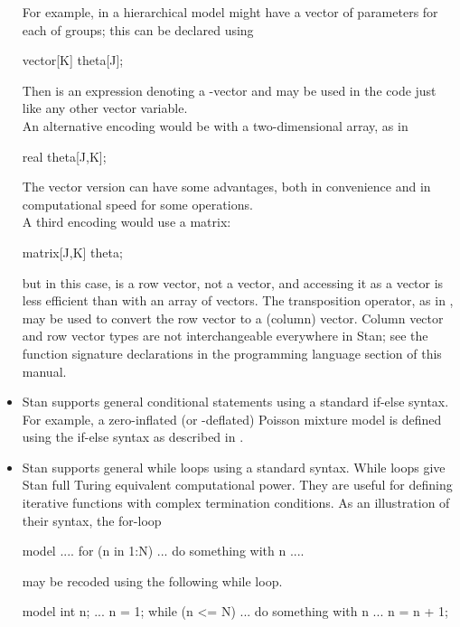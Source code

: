 \begin{itemize}
  For example, in a hierarchical model might have a vector of 
  parameters for each of  groups; this can be declared using
\begin{stancode}
vector[K] theta[J];
\end{stancode}
%
Then  is an expression denoting a -vector and
may be used in the code just like any other vector variable.
\\[6pt]
An alternative encoding would be with a two-dimensional array, as in
\begin{stancode}
real theta[J,K];
\end{stancode}
%
The vector version can have some advantages, both in convenience and
in computational speed for some operations.
\\[6pt]
A third encoding would use a matrix:
%
\begin{stancode}
matrix[J,K] theta;
\end{stancode}
%
but in this case,  is a row vector, not a vector, and
accessing it as a vector is less efficient than with an array of
vectors.  The transposition operator, as in , may be
used to convert the row vector  to a (column) vector.
Column vector and row vector types are not interchangeable everywhere
in Stan; see the function signature declarations in the programming
language section of this manual.
%
\item Stan supports general conditional statements using a standard
  if-else syntax.  For example, a zero-inflated (or -deflated) Poisson
  mixture model is defined using the if-else syntax as described in
  . 
%
\item Stan supports general while loops using a standard syntax.  
While loops give Stan full Turing equivalent computational power.
They are useful for defining iterative functions with complex
termination conditions.  As an illustration of their syntax,
the for-loop
%
\begin{stancode}
model {
    ....
    for (n in 1:N) {
        ... do something with n ....
    }
}
\end{stancode}
%
may be recoded using the following while loop.
%
\begin{stancode}
model {
    int n;
    ...
    n = 1;
    while (n <= N) {
        ... do something with n ...
        n = n + 1;
    }
}
\end{stancode}
%


\end{itemize}



